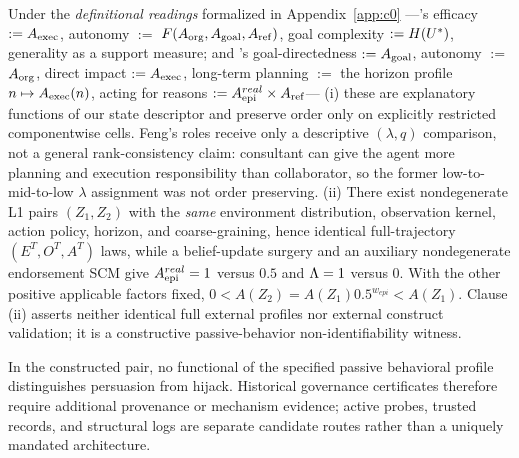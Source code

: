 \begin{proposition}\label{prop:c0}
Under the \emph{definitional readings} formalized in Appendix~\ref{app:c0}
---\citet{kasirzadeh2025}'s efficacy $:=A_{\mathrm{exec}}$, autonomy
$:=$ $F(A_{\mathrm{org}},A_{\mathrm{goal}},A_{\mathrm{ref}})$, goal complexity $:=H(U^{*})$, generality as a
support measure; and \citet{dung2024}'s goal-directedness $:=A_{\mathrm{goal}}$, autonomy
$:=$ $A_{\mathrm{org}}$, direct impact $:=A_{\mathrm{exec}}$, long-term planning $:=$ the horizon
profile $n\mapsto A_{\mathrm{exec}}(n)$, acting for reasons $:=A_{\mathrm{epi}}^{real}\times A_{\mathrm{ref}}$---
\textup{(i)} these are explanatory functions of our state descriptor and
preserve order only on explicitly restricted componentwise cells. Feng's
roles receive only a descriptive $(\lambda,q)$ comparison, not a general
rank-consistency claim: consultant can give the agent more planning and
execution responsibility than collaborator, so the former low-to-mid-to-low
$\lambda$ assignment was not order preserving. \textup{(ii)} There exist
nondegenerate L1 pairs $(Z_1,Z_2)$ with the \emph{same} environment
distribution, observation kernel, action policy, horizon, and coarse-graining,
hence identical full-trajectory $(E^T,O^T,A^T)$ laws, while a belief-update surgery and
an auxiliary nondegenerate endorsement SCM give $A_{\mathrm{epi}}^{real}=1$ versus $0.5$
and $\Lambda=1$ versus $0$. With the other positive applicable factors fixed,
$0<A(Z_2)=A(Z_1)0.5^{w_{epi}}<A(Z_1)$. Clause (ii) asserts neither identical
full external profiles nor external construct validation; it is a
constructive passive-behavior non-identifiability witness.
\end{proposition}
\begin{corollary}\label{cor:c0}
In the constructed pair, no functional of the specified passive behavioral
profile distinguishes persuasion from hijack. Historical governance
certificates therefore require additional provenance or mechanism evidence;
active probes, trusted records, and structural logs are separate candidate
routes rather than a uniquely mandated architecture.
\end{corollary}
